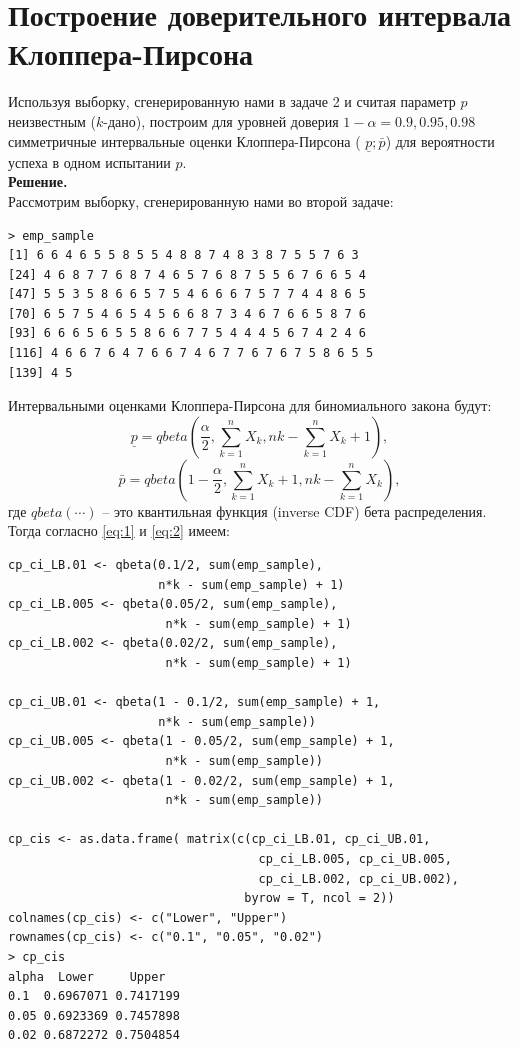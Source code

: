 \documentclass[14pt,a4paper]{scrartcl}
\begin{document}
\section{Построение доверительного интервала Клоппера-Пирсона}\label{sec1}
Используя выборку, сгенерированную нами в задаче 2 и считая параметр $p$ неизвестным ($k$-дано), построим для уровней доверия $1-\alpha=0.9, 0.95, 0.98$ симметричные интервальные оценки Клоппера-Пирсона ( $\underline{p};\bar{p}$) для вероятности успеха в одном испытании $p$. \\
\textbf{Решение.}\\
Рассмотрим выборку, сгенерированную нами во второй задаче:
\begin{verbatim}
> emp_sample
[1] 6 6 4 6 5 5 8 5 5 4 8 8 7 4 8 3 8 7 5 5 7 6 3
[24] 4 6 8 7 7 6 8 7 4 6 5 7 6 8 7 5 5 6 7 6 6 5 4
[47] 5 5 3 5 8 6 6 5 7 5 4 6 6 6 7 5 7 7 4 4 8 6 5
[70] 6 5 7 5 4 6 5 4 5 6 6 8 7 3 4 6 7 6 6 5 8 7 6
[93] 6 6 6 5 6 5 5 8 6 6 7 7 5 4 4 4 5 6 7 4 2 4 6
[116] 4 6 6 7 6 4 7 6 6 7 4 6 7 7 6 7 6 7 5 8 6 5 5
[139] 4 5
\end{verbatim}
Интервальными оценками Клоппера-Пирсона для биномиального закона будут:
\begin{equation}\label{eq:1}
	\underline{p}=q b e t a\left(\frac{\alpha}{2}, \sum_{k=1}^{n} X_{k}, n k-\sum_{k=1}^{n} X_{k}+1\right),
\end{equation}
\begin{equation}\label{eq:2}
	\bar{p}=q b e t a\left(1-\frac{\alpha}{2}, \sum_{k=1}^{n} X_{k}+1, n k-\sum_{k=1}^{n} X_{k}\right),
\end{equation}
где $qbeta(\cdots)$ -- это квантильная функция (inverse CDF) бета распределения. \\
Тогда согласно \ref{eq:1} и \ref{eq:2} имеем:
\begin{verbatim}
cp_ci_LB.01 <- qbeta(0.1/2, sum(emp_sample), 
                     n*k - sum(emp_sample) + 1)
cp_ci_LB.005 <- qbeta(0.05/2, sum(emp_sample), 
                      n*k - sum(emp_sample) + 1)
cp_ci_LB.002 <- qbeta(0.02/2, sum(emp_sample), 
                      n*k - sum(emp_sample) + 1)

cp_ci_UB.01 <- qbeta(1 - 0.1/2, sum(emp_sample) + 1, 
                     n*k - sum(emp_sample))
cp_ci_UB.005 <- qbeta(1 - 0.05/2, sum(emp_sample) + 1, 
                      n*k - sum(emp_sample))
cp_ci_UB.002 <- qbeta(1 - 0.02/2, sum(emp_sample) + 1, 
                      n*k - sum(emp_sample))

cp_cis <- as.data.frame( matrix(c(cp_ci_LB.01, cp_ci_UB.01,
                                   cp_ci_LB.005, cp_ci_UB.005,
                                   cp_ci_LB.002, cp_ci_UB.002), 
                                 byrow = T, ncol = 2))
colnames(cp_cis) <- c("Lower", "Upper")
rownames(cp_cis) <- c("0.1", "0.05", "0.02")
> cp_cis
alpha  Lower     Upper
0.1  0.6967071 0.7417199
0.05 0.6923369 0.7457898
0.02 0.6872272 0.7504854
\end{verbatim}
\end{document}
